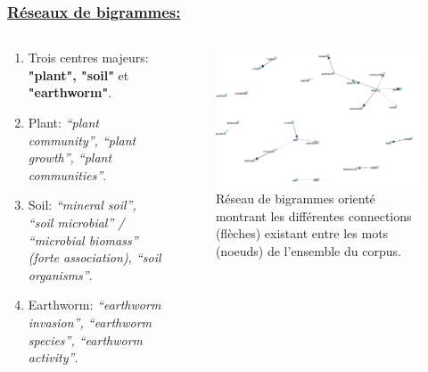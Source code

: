 \documentclass[xcolor=dvipsnames]{beamer}
\begin{document}
	\begin{frame}
		\frametitle{\underline{Réseaux de bigrammes:}}
		\begin{columns}
			\begin{column}{0.5\textwidth} %
				\begin{enumerate}
					\item Trois centres majeurs: \textbf{"plant", "soil"} et \textbf{"earthworm"}.
					\item Plant: \textit{“plant community”, “plant growth”, “plant communities”}.
					\item Soil: \textit{“mineral soil”, “soil microbial” / “microbial biomass” (forte
					association), “soil organisms”}.
					\item Earthworm: \textit{“earthworm invasion”, “earthworm species”, “earthworm activity”}.
				\end{enumerate}
			\end{column}
			\begin{column}{0.5\textwidth}
				\begin{figure}[htb] %
					\begin{center} %
						\includegraphics[width=1\textwidth]{network_all_(oriented).png}
						\caption{Réseau de bigrammes orienté montrant les différentes connections (flèches) existant entre les mots (noeuds) de l'ensemble du corpus.}\label{nw_all_oriented}
					\end{center}
				\end{figure}
			\end{column}
		\end{columns}
	\end{frame}
\end{document}
